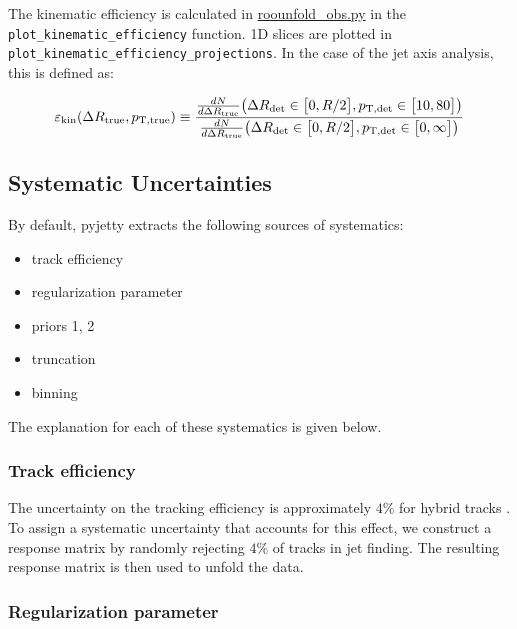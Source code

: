 \documentclass[12pt]{article}
\begin{document}
\begin{enumerate}
The kinematic efficiency is calculated in \href{https://github.com/reynier0611/pyjetty/blob/master/pyjetty/alice_analysis/analysis/user/substructure/roounfold_obs.py}{roounfold\_obs.py} in the \verb|plot_kinematic_efficiency| function.
1D slices are plotted in \verb|plot_kinematic_efficiency_projections|. In the case of the jet axis analysis, this is defined as:

\begin{equation}
\varepsilon_{\rm kin}(\Delta R_{\rm true} , p_{\rm T, true}) \equiv \frac{\frac{dN}{d\Delta R_{\rm true}}\big(\Delta R_{\rm det}\in \big[0,R/2\big],p_{\rm T, det} \in \big[10,80\big]\big)}{\frac{dN}{d\Delta R_{\rm true}}\big(\Delta R_{\rm det}\in \big[0,R/2\big],p_{\rm T, det} \in \big[0,\infty\big]\big)}
\end{equation}

\end{enumerate}

\subsection{Systematic Uncertainties}

By default, pyjetty extracts the following sources of systematics:

\begin{itemize}
\item track efficiency
\item regularization parameter
\item priors 1, 2
\item truncation
\item binning
\end{itemize}

The explanation for each of these systematics is given below.

\subsubsection{Track efficiency}

The uncertainty on the tracking efficiency is approximately $4\%$ for hybrid tracks \cite{Alice_AN_534,Alice_AN_818,james,ezra}.
To assign a systematic uncertainty that accounts for this effect, we construct a response matrix by randomly rejecting $4\%$ of tracks in jet finding.
The resulting response matrix is then used to unfold the data.

\subsubsection{Regularization parameter}
\end{document}
